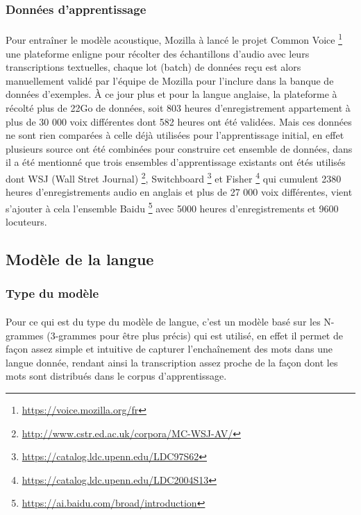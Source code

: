 		\subsubsection*{Données d'apprentissage}
		\paragraph{}
		Pour entraîner le modèle acoustique, Mozilla à lancé le projet Common Voice  \footnote{\url{https://voice.mozilla.org/fr}} une plateforme enligne pour récolter des échantillons d'audio avec leurs transcriptions textuelles, chaque lot (batch) de données reçu est alors manuellement validé par l'équipe de Mozilla pour l'inclure dans la banque de données d'exemples. À ce jour plus et pour la langue anglaise, la plateforme à récolté plus de 22Go de données, soit 803 heures d'enregistrement appartement à plus de 30 000 voix différentes dont 582 heures ont été validées. Mais ces données ne sont rien comparées à celle déjà utilisées pour l'apprentissage initial, en effet plusieurs source ont été combinées pour construire cet ensemble de données, dans \cite{deepspeech_paper} il a été mentionné que trois ensembles d'apprentissage existants ont étés utilisés dont WSJ (Wall Stret Journal) \footnote{\url{http://www.cstr.ed.ac.uk/corpora/MC-WSJ-AV/}}, Switchboard \footnote{\url{https://catalog.ldc.upenn.edu/LDC97S62}} et Fisher \footnote{\url{https://catalog.ldc.upenn.edu/LDC2004S13}} qui cumulent 2380 heures d'enregistrements audio en anglais et plus de 27 000 voix différentes, vient s'ajouter à cela l'ensemble Baidu \footnote{\url{https://ai.baidu.com/broad/introduction}} avec 5000 heures d'enregistrements et 9600 locuteurs.
		
	\subsection{Modèle de la langue}
		\subsubsection*{Type du modèle}
		\paragraph{}
		Pour ce qui est du type du modèle de langue, c'est un modèle basé sur les N-grammes (3-grammes pour être plus précis) qui est utilisé, en effet il permet de façon assez simple et intuitive de capturer l'enchaînement des mots dans une langue donnée, rendant ainsi la transcription assez proche de la façon dont les mots sont distribués dans le corpus d'apprentissage.
		
